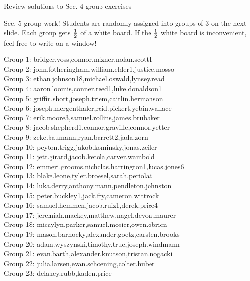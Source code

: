 \documentclass[10pt]{beamer}
\begin{document}
\begin{frame}[standout]

\vfill 
\alert{Review solutions to Sec. 4 group exercises}
\vfill

\end{frame}



\begin{frame}[standout]

\alert{Sec. 5 group work!}
\vfill
Students are randomly assigned into groups of 3 on the next slide.
\vfill 
Each group gets $\frac{1}{2}$ of a white board.
\vfill
If the  $\frac{1}{2}$ white board is inconvenient, feel free to write on a window! 
\end{frame}

\begin{frame}
\footnotesize
Group 1: bridger.voss,connor.mizner,nolan.scott1\\
Group 2: john.fotheringham,william.elder1,justice.mosso\\
Group 3: ethan.johnson18,michael.oswald,lynsey.read\\
Group 4: aaron.loomis,conner.reed1,luke.donaldson1\\
Group 5: griffin.short,joseph.triem,caitlin.hermanson\\
Group 6: joseph.mergenthaler,reid.pickert,yebin.wallace\\
Group 7: erik.moore3,samuel.rollins,james.brubaker\\
Group 8: jacob.shepherd1,connor.graville,connor.yetter\\
Group 9: zeke.baumann,ryan.barrett2,jada.zorn\\
Group 10: peyton.trigg,jakob.kominsky,jonas.zeiler\\
Group 11: jett.girard,jacob.ketola,carver.wambold\\
Group 12: emmeri.grooms,nicholas.harrington1,lucas.jones6\\
Group 13: blake.leone,tyler.broesel,sarah.periolat\\
Group 14: luka.derry,anthony.mann,pendleton.johnston\\
Group 15: peter.buckley1,jack.fry,cameron.wittrock\\
Group 16: samuel.hemmen,jacob.ruiz1,derek.price4\\
Group 17: jeremiah.mackey,matthew.nagel,devon.maurer\\
Group 18: micaylyn.parker,samuel.mosier,owen.obrien\\
Group 19: mason.barnocky,alexander.goetz,carsten.brooks\\
Group 20: adam.wyszynski,timothy.true,joseph.windmann\\
Group 21: evan.barth,alexander.knutson,tristan.nogacki\\
Group 22: julia.larsen,evan.schoening,colter.huber\\
Group 23: delaney.rubb,kaden.price
\end{frame}
\end{document}
